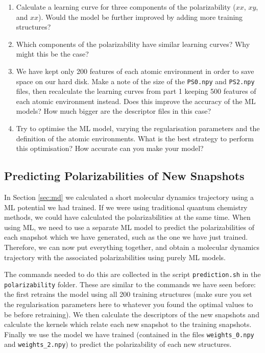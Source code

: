\documentclass{article}
\begin{document}
\begin{enumerate}

\item Calculate a learning curve for three components of the polarizability ($xx$, $xy$, and $xx$). Would the model be further improved by adding more training structures?
\item Which components of the polarizability have similar learning curves? Why might this be the case?
\item We have kept only 200 features of each atomic environment in order to save space on our hard disk. Make a note of the size of the \verb|PS0.npy| and \verb|PS2.npy| files, then recalculate the learning curves from part 1 keeping 500 features of each atomic environment instead. Does this improve the accuracy of the ML models? How much bigger are the descriptor files in this case?
\item Try to optimise the ML model, varying the regularisation parameters and the definition of the atomic environments. What is the best strategy to perform this optimisation? How accurate can you make your model?

\end{enumerate}

\subsection*{Predicting Polarizabilities of New Snapshots}

In Section \ref{sec:md} we calculated a short molecular dynamics trajectory using a ML potential we had trained. If we were using traditional quantum chemistry methods, we could have calculated the polarizabilities at the same time. When using ML, we need to use a separate ML model to predict the polarizabilities of each snapshot which we have generated, such as the one we have just trained. Therefore, we can now put everything together, and obtain a molecular dynamics trajectory with the associated polarizabilities using purely ML models.

The commands needed to do this are collected in the script \verb|prediction.sh| in the \verb|polarizability| folder. These are similar to the commands we have seen before: the first retrains the model using all 200 training structures (make sure you set the regularisation parameters here to whatever you found the optimal values to be before retraining). We then calculate the descriptors of the new snapshots and calculate the kernels which relate each new snapshot to the training snapshots. Finally we use the model we have trained (contained in the files \verb|weights_0.npy| and \verb|weights_2.npy|) to predict the polarizability of each new structures.
\end{document}
